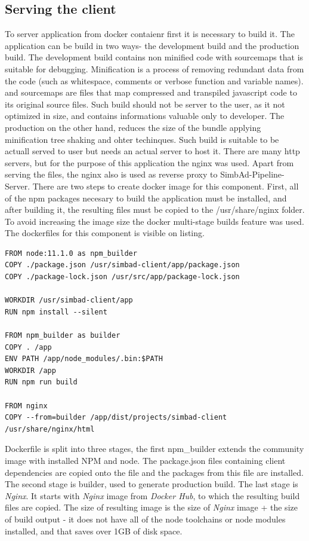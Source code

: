 \subsection{Serving the client}
To server application from docker contaienr first it is necessary to build it. The application can be build in two ways- the development build and the production build. The development build contains non minified code with sourcemaps that is suitable for debugging.  Minification is a process of removing redundant data from the code (such as whitespace, comments or verbose function and variable names). and sourcemaps are files that map compressed and transpiled javascript code to its original source files. Such build should not be server to the user, as it not optimized in size, and contains informations valuable only to developer. The production on the other hand, reduces the size of the bundle applying minification tree shaking and ohter techinques. Such build is suitable to be actuall served to user but needs an actual server to host it. There are many http servers, but for the purpose of this application the nginx was used. Apart from serving the files, the nginx also is used as reverse proxy to SimbAd-Pipeline-Server. 
There are two steps to create docker image for this component. First, all of the npm packages necesary to build the application must be installed, and after building it, the resulting files must be copied to the /usr/share/nginx folder. To avoid increasing the image size the docker multi-stage builds feature was used. The dockerfiles for this component is visible on listing.
\begin{lstlisting}[label=list:sc-docker,caption=Dockerfile used to build \textit{SimBaD-Client}, basicstyle=\footnotesize\ttfamily]
FROM node:11.1.0 as npm_builder
COPY ./package.json /usr/simbad-client/app/package.json
COPY ./package-lock.json /usr/src/app/package-lock.json

WORKDIR /usr/simbad-client/app
RUN npm install --silent

FROM npm_builder as builder
COPY . /app
ENV PATH /app/node_modules/.bin:$PATH
WORKDIR /app
RUN npm run build

FROM nginx
COPY --from=builder /app/dist/projects/simbad-client /usr/share/nginx/html
\end{lstlisting}
Dockerfile is split into three stages, the first npm\_builder extends the community image with installed NPM and node.
The package.json files containing client dependencies are copied onto the file and the packages from this file are installed. The second stage is builder, used to generate production build. The last stage is \textit{Nginx}. It starts with \textit{Nginx} image from \textit{Docker Hub}, to which the resulting build files are copied. The size of resulting image is the size of \textit{Nginx} image + the size of build output - it does not have all of the node toolchains or node modules installed, and that saves over 1GB of disk space.
